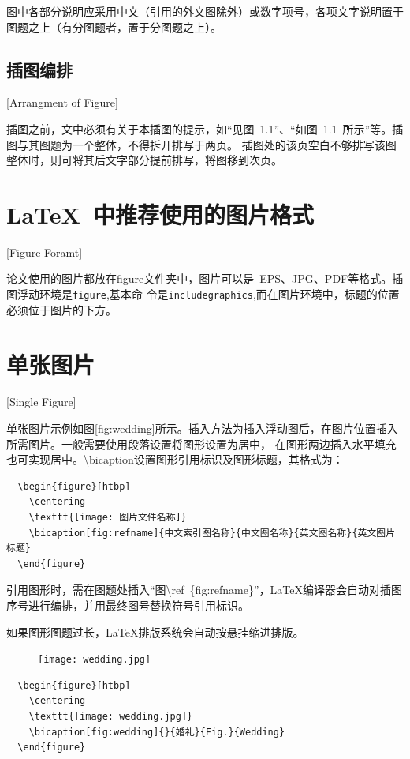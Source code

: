 图中各部分说明应采用中文（引用的外文图除外）或数字项号，各项文字说明置于图题之上（有分图题者，置于分图题之上）。

\subsection{插图编排}[Arrangment of Figure]

插图之前，文中必须有关于本插图的提示，如“见图~1.1”、“如图~1.1~所示”等。插图与其图题为一个整体，不得拆开排写于两页。
插图处的该页空白不够排写该图整体时，则可将其后文字部分提前排写，将图移到次页。

\section{LaTeX~中推荐使用的图片格式}[Figure Foramt]

论文使用的图片都放在figure文件夹中，图片可以是~EPS、JPG、PDF等格式。插图浮动环境是\texttt{figure},基本命
令是\texttt{includegraphics},而在图片环境中，标题的位置必须位于图片的下方。

\section{单张图片}[Single Figure]

单张图片示例如图\ref{fig:wedding}所示。插入方法为插入浮动图后，在图片位置插入所需图片。一般需要使用段落设置将图形设置为居中，
在图形两边插入水平填充也可实现居中。\textbackslash bicaption设置图形引用标识及图形标题，其格式为：

\begin{lstlisting}
  \begin{figure}[htbp]
    \centering
    \texttt{[image: 图片文件名称]}
    \bicaption[fig:refname]{中文索引图名称}{中文图名称}{英文图名称}{英文图片标题}
  \end{figure}
\end{lstlisting}

引用图形时，需在图题处插入“图\textbackslash ref~\{fig:refname\}”，\LaTeX{}编译器会自动对插图序号进行编排，并用最终图号替换符号引用标识。

如果图形图题过长，\LaTeX{}排版系统会自动按悬挂缩进排版。

\begin{figure}[htbp]
  \centering
  \texttt{[image: wedding.jpg]}
\end{figure}

\begin{lstlisting}
  \begin{figure}[htbp]
    \centering
    \texttt{[image: wedding.jpg]}
    \bicaption[fig:wedding]{}{婚礼}{Fig.}{Wedding}
  \end{figure}
\end{lstlisting}

